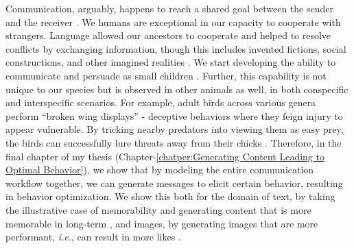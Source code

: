 \documentclass[PhD]{iiitd}
\renewcommand{\cite}[1]{\citep{#1}}
\begin{document}
Communication, arguably, happens to reach a shared goal between the sender and the receiver \cite{smith2003animal}. We humans are exceptional in our capacity to cooperate with strangers. Language allowed our ancestors to cooperate and helped to resolve conflicts by exchanging information, though this includes invented fictions, social constructions, and other imagined realities \cite{misyak2016instantaneous,mccroskey2015introduction,smith1997major}. We start developing the ability to communicate and persuade as small children \cite{perner1985john}. Further, this capability is not unique to our species but is observed in other animals as well, in both conspecific \cite{hare2000chimpanzees,smith2003animal} and interspecific \cite{krebs1984animal,fouts200235} scenarios. For example, adult birds across various genera perform ``broken wing displays'' - deceptive behaviors where they feign injury to appear vulnerable. By tricking nearby predators into viewing them as easy prey, the birds can successfully lure threats away from their chicks \cite{griffin2001animal}. Therefore, in the final chapter of my thesis (Chapter-\ref{chatper:Generating Content Leading to Optimal Behavior}), we show that by modeling the entire communication workflow together, we can generate messages to elicit certain behavior, resulting in behavior optimization. We show this both for the domain of text, by taking the illustrative case of memorability and generating content that is more memorable in long-term \cite{si2023long}, and images, by generating images that are more performant, \textit{i.e.}, can result in more likes \cite{khurana2023behavior}. 
\end{document}

